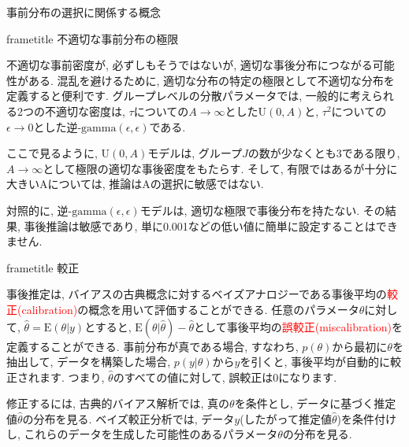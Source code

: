 \documentclass[10pt,dvipdfmx,a4]{beamer}
\newcommand{\dbox}[1]{\begin{beamercolorbox}[wd=122mm, sep=0pt, shadow=false, rounded=false]{frametitle} { #1}\end{beamercolorbox}}
\newcommand{\tcr}[1]{\textcolor{red}{#1}}
\begin{document}

\begin{frame}{事前分布の選択に関係する概念}
\dbox{不適切な事前分布の極限}
不適切な事前密度が, 必ずしもそうではないが, 適切な事後分布につながる可能性がある.
混乱を避けるために, 適切な分布の特定の極限として不適切な分布を定義すると便利です.
グループレベルの分散パラメータでは, 一般的に考えられる2つの不適切な密度は, $\tau$についての$A\rightarrow \infty$とした$\text{U}(0, A)$と, $\tau^2$についての$\epsilon\rightarrow 0$とした逆-$\text{gamma}(\epsilon, \epsilon)$である.

ここで見るように, $\text{U}(0,A)$モデルは, グループ$J$の数が少なくとも3である限り, $A\rightarrow\infty$として極限の適切な事後密度をもたらす.
そして, 有限ではあるが十分に大きいAについては, 推論はAの選択に敏感ではない.

対照的に, 逆-$\text{gamma}(\epsilon,\epsilon)$モデルは, 適切な極限で事後分布を持たない.
その結果, 事後推論は敏感であり, 単に0.001などの低い値に簡単に設定することはできません.
\end{frame}


\begin{frame}
\dbox{較正}
事後推定は, バイアスの古典概念に対するベイズアナロジーである事後平均の\tcr{較正(calibration)}の概念を用いて評価することができる.
任意のパラメータ$\theta$に対して, $\hat{\theta}=\text{E}(\theta|y)$とすると, $\text{E}(\theta|\hat{\theta})-\hat{\theta}$として事後平均の\tcr{誤較正(miscalibration)}を定義することができる.
事前分布が真である場合, すなわち, $p(\theta)$から最初に$\theta$を抽出して, データを構築した場合, $p(y|\theta)$から$y$を引くと, 事後平均が自動的に較正されます.
つまり, $\hat{\theta}$のすべての値に対して, 誤較正は0になります.

修正するには,
古典的バイアス解析では, 真の$\theta$を条件とし, データに基づく推定値$\hat{\theta}$の分布を見る.
ベイズ較正分析では, データ$y$(したがって推定値$\hat{\theta}$)を条件付けし, これらのデータを生成した可能性のあるパラメータ$\theta$の分布を見る.
\end{frame}

\end{document}
